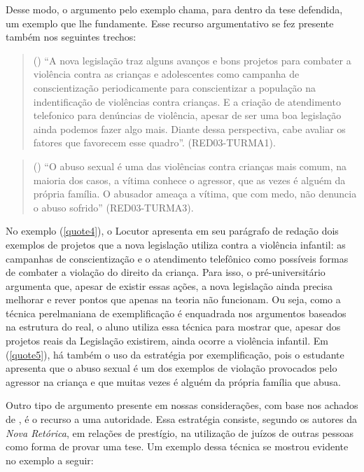 \documentclass{textolivre}
\newcounter{quote}
\newenvironment{myquote}%
{%
\refstepcounter{quote}%
\begin{quote}(\thequote)%
}%
{\end{quote}}%
\begin{document}
Desse modo, o argumento pelo exemplo chama, para dentro da tese defendida, um exemplo que lhe fundamente. Esse recurso argumentativo se fez presente também nos seguintes trechos:

\begin{myquote}\label{quote4}
“A nova legislação traz alguns avanços e bons projetos para combater a violência contra as crianças e adolescentes como campanha de conscientização periodicamente para conscientizar a população na indentificação de violências contra crianças. E a criação de atendimento telefonico para denúncias de violência, apesar de ser uma boa legislação ainda podemos fazer algo mais. Diante dessa perspectiva, cabe avaliar os fatores que favorecem esse quadro”. (RED03-TURMA1).
\end{myquote}
\begin{myquote}\label{quote5}
“O abuso sexual é uma das violências contra crianças mais comum, na maioria dos casos, a vítima conhece o agressor, que as vezes é alguém da própria família. O abusador ameaça a vítima, que com medo, não denuncia o abuso sofrido” (RED03-TURMA3).
\end{myquote}

No exemplo (\ref{quote4}), o Locutor apresenta em seu parágrafo de redação dois exemplos de projetos que a nova legislação utiliza contra a violência infantil: as campanhas de conscientização e o atendimento telefônico como possíveis formas de combater a violação do direito da criança. Para isso, o pré-universitário argumenta que, apesar de existir essas ações, a nova legislação ainda precisa melhorar e rever pontos que apenas na teoria não funcionam. Ou seja, como a técnica perelmaniana de exemplificação é enquadrada nos argumentos baseados na estrutura do real, o aluno utiliza essa técnica para mostrar que, apesar dos projetos reais da Legislação existirem, ainda ocorre a violência infantil. Em (\ref{quote5}), há também o uso da estratégia por exemplificação, pois o estudante apresenta que o abuso sexual é um dos exemplos de violação provocados pelo agressor na criança e que muitas vezes é alguém da própria família que abusa. 

Outro tipo de argumento presente em nossas considerações, com base nos achados de \textcite{perelman1996, fiorin2018}, é o recurso a uma autoridade. Essa estratégia consiste, segundo os autores da \emph{Nova Retórica}, em relações de prestígio, na utilização de juízos de outras pessoas como forma de provar uma tese. Um exemplo dessa técnica se mostrou evidente no exemplo a seguir:
\end{document}
